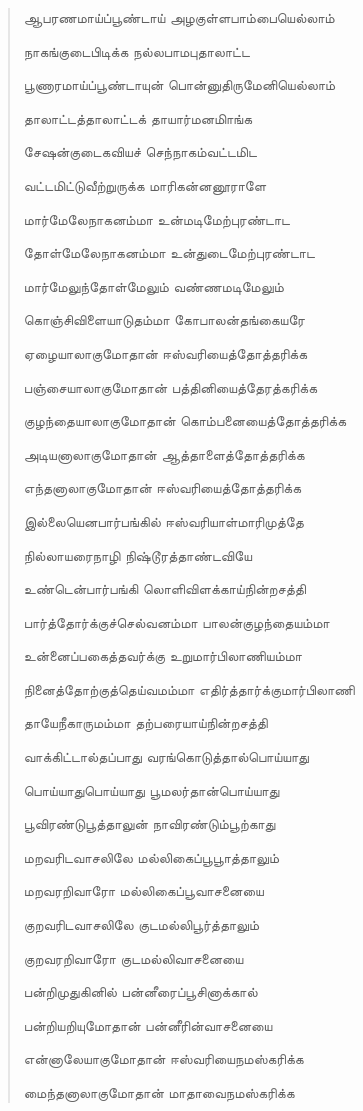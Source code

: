 \documentclass{article}
\begin{document}
\begin{quotation}
{ஆபரணமாய்ப்பூண்டாய் அழகுள்ளபாம்பையெல்லாம்

நாகங்குடைபிடிக்க நல்லபாமபுதாலாட்ட

பூணாரமாய்ப்பூண்டாயுன் பொன்னுதிருமேனியெல்லாம்

தாலாட்டத்தாலாட்டக் தாயார்மனமிாங்க

சேஷன்குடைகவியச் செந்நாகம்வட்டமிட

வட்டமிட்டுவீற்றுருக்க மாரிகன்னனூராளே

மார்மேலேநாகனம்மா உன்மடிமேற்புரண்டாட

தோள்மேலேநாகனம்மா உன்துடைமேற்புரண்டாட

மார்மேலுந்தோள்மேலும் வண்ணமடிமேலும்

கொஞ்சிவிளையாடுதம்மா கோபாலன்தங்கையரே

ஏழையாலாகுமோதான் ஈஸ்வரியைத்தோத்தரிக்க

பஞ்சையாலாகுமோதான்‌ பத்தினியைத்தேரத்கரிக்க

குழந்தையாலாகுமோதான் கொம்பனையைத்தோத்தரிக்க

அடியனாலாகுமோதான் ஆத்தாளைத்தோத்தரிக்க

எந்தனாலாகுமோதான் ஈஸ்வரியைத்தோத்தரிக்க

இல்லையெனபார்பங்கில் ஈஸ்வரியாள்மாரிமுத்தே

நில்லாயரைநாழி நிஷ்டூரத்தாண்டவியே

உண்டென்பார்பங்கி லொளிவிளக்காய்நின்றசத்தி

பார்த்தோர்க்குச்செல்வனம்மா பாலன்குழந்தையம்மா

உன்னைப்பகைத்தவர்க்கு உறுமார்பிலாணியம்மா

நினைத்தோற்குத்தெய்வமம்மா எதிர்த்தார்க்குமார்பிலாணி

தாயேநீகாருமம்மா தற்பரையாய்நின்றசத்தி

வாக்கிட்டால்தப்பாது வரங்கொடுத்தால்பொய்யாது

பொய்யாதுபொய்யாது பூமலர்தான்பொய்யாது

பூவிரண்டுபூத்தாலுன் நாவிரண்டும்பூற்காது

மறவரிடவாசலிலே மல்லிகைப்பூபூாத்தாலும்

மறவரறிவாரோ மல்லிகைப்பூவாசனையை

குறவரிடவாசலிலே குடமல்லிபூர்த்தாலும்

குறவரறிவாரோ குடமல்லிவாசனையை

பன்றிமுதுகினில் பன்னீரைப்பூசினாக்கால்

பன்றியறியுமோதான் பன்னீரின்வாசனையை

என்னாலேயாகுமோதான் ஈஸ்வரியைநமஸ்கரிக்க

மைந்தனாலாகுமோதான் மாதாவைநமஸ்கரிக்க

}
\end{quotation}
\end{document}
